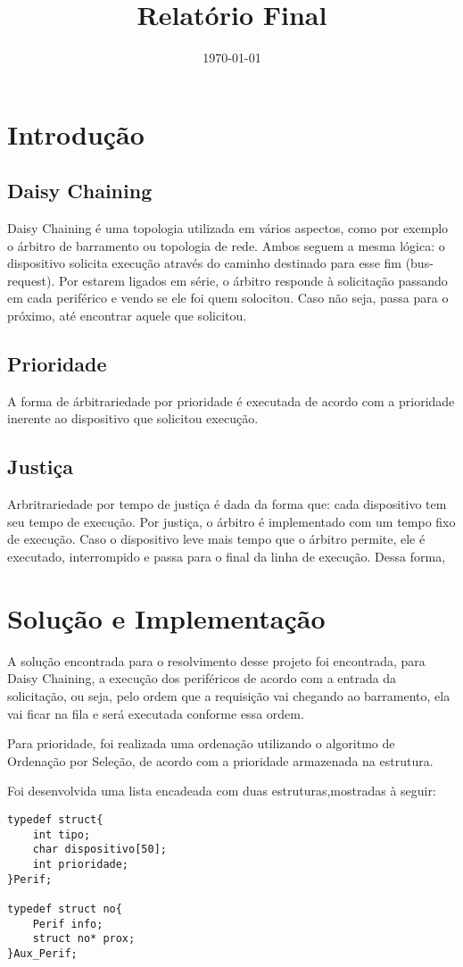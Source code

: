\documentclass[12pt, oneside,a4paper, brazil]{abntex2}
\title{Relatório Final}
\date{\today}
\begin{document}

\frenchspacing
\imprimircapa
\imprimirfolhaderosto

\tableofcontents
\chapter{Introdução}
\section{Daisy Chaining}
Daisy Chaining é uma topologia utilizada em vários aspectos, como por exemplo o árbitro de barramento ou topologia de rede. Ambos seguem a mesma lógica: o dispositivo solicita execução através do caminho destinado para esse fim (bus-request). Por estarem ligados em série, o árbitro responde à solicitação passando em cada periférico e vendo se ele foi quem solocitou. Caso não seja, passa para o próximo, até encontrar aquele que solicitou. 
\section{Prioridade}
A forma de árbitrariedade por prioridade é executada de acordo com a prioridade inerente ao dispositivo que solicitou execução. 
\section{Justiça}
Arbritrariedade por tempo de justiça é dada da forma que: cada dispositivo tem seu tempo de execução. Por justiça, o árbitro é implementado com um tempo fixo de execução. Caso o dispositivo leve mais tempo que o árbitro permite, ele é executado, interrompido e passa para o final da linha de execução. Dessa forma, 
\chapter{Solução e Implementação}
A solução encontrada para o resolvimento desse projeto foi encontrada, para Daisy Chaining, a execução dos periféricos de acordo com a entrada da solicitação, ou seja, pelo ordem que a requisição vai chegando ao barramento, ela vai ficar na fila e será executada conforme essa ordem. 

Para prioridade, foi realizada uma ordenação utilizando o algoritmo de Ordenação por Seleção, de acordo com a prioridade armazenada na estrutura. 

Foi desenvolvida uma lista encadeada com duas estruturas,mostradas à seguir: 
\begin{lstlisting}
typedef struct{
	int tipo;
	char dispositivo[50];
	int prioridade;
}Perif;

typedef struct no{
	Perif info;
	struct no* prox;
}Aux_Perif;
\end{lstlisting}
\end{document}

